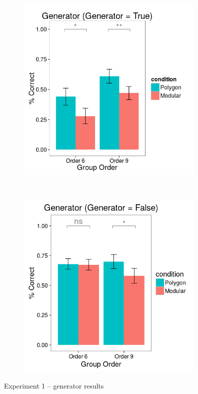 \documentclass[man,10pt]{apa6}
\begin{document}
\begin{figure}[H]
\centering
\begin{subfigure}[c]{0.3\textwidth}
\centering
\includegraphics[width=\textwidth]{figures/1/gen_T_r.png}
\end{subfigure}
~
\begin{subfigure}[c]{0.3\textwidth}
\centering
\includegraphics[width=\textwidth]{figures/1/gen_F_r.png}
\end{subfigure}
\caption{Experiment 1 -- generator results}
\label{ex1_gen}
\end{figure}\noindent 
\end{document}
